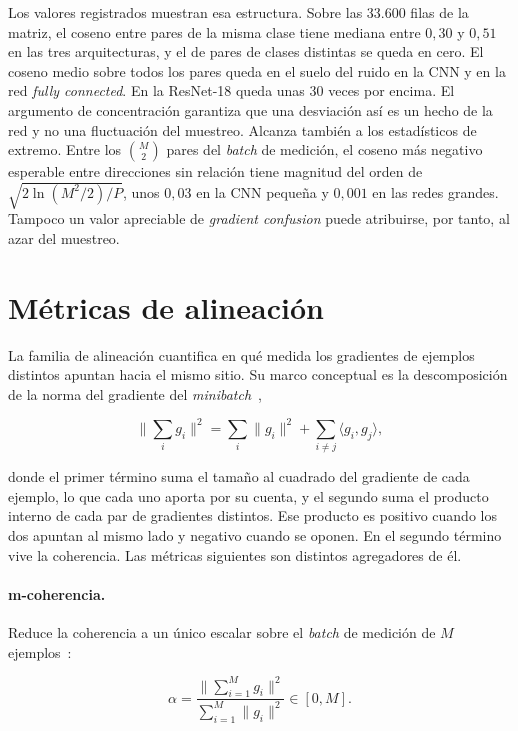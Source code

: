Los valores registrados muestran esa estructura. Sobre las 33.600 filas de la matriz, el coseno entre pares de la misma clase tiene mediana entre $0{,}30$ y $0{,}51$ en las tres arquitecturas, y el de pares de clases distintas se queda en cero. El coseno medio sobre todos los pares queda en el suelo del ruido en la CNN y en la red \emph{fully connected}. En la ResNet-18 queda unas 30 veces por encima. El argumento de concentración garantiza que una desviación así es un hecho de la red y no una fluctuación del muestreo. Alcanza también a los estadísticos de extremo. Entre los $\binom{M}{2}$ pares del \emph{batch} de medición, el coseno más negativo esperable entre direcciones sin relación tiene magnitud del orden de $\sqrt{2\ln(M^2/2)/P}$, unos $0{,}03$ en la CNN pequeña y $0{,}001$ en las redes grandes. Tampoco un valor apreciable de \emph{gradient confusion} puede atribuirse, por tanto, al azar del muestreo.

\section{Métricas de alineación}
\label{sec:def-alineacion}

La familia de alineación cuantifica en qué medida los gradientes de ejemplos distintos apuntan hacia el mismo sitio. Su marco conceptual es la descomposición de la norma del gradiente del \emph{minibatch}~\cite{chatterjee2020coherent},

\begin{equation}
\Big\|\sum_i g_i\Big\|^2 = \sum_i \|g_i\|^2 + \sum_{i \neq j} \langle g_i, g_j\rangle,
\label{eq:cgh}
\end{equation}

donde el primer término suma el tamaño al cuadrado del gradiente de cada ejemplo, lo que cada uno aporta por su cuenta, y el segundo suma el producto interno de cada par de gradientes distintos. Ese producto es positivo cuando los dos apuntan al mismo lado y negativo cuando se oponen. En el segundo término vive la coherencia. Las métricas siguientes son distintos agregadores de él.

\paragraph{m-coherencia.} Reduce la coherencia a un único escalar sobre el \emph{batch} de medición de $M$
ejemplos~\cite{chatterjee2020making}:

\begin{equation}
\alpha = \frac{\big\|\sum_{i=1}^{M} g_i\big\|^2}{\sum_{i=1}^{M} \|g_i\|^2} \in [0, M].
\label{eq:mcoherence}
\end{equation}

